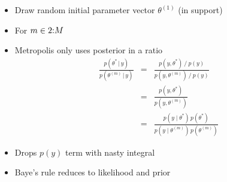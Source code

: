 \documentclass[10pt]{report}
\begin{document}
%
\begin{itemize}
\item Draw random initial parameter vector $\theta^{(1)}$ (in
  support)
\item For $m \in 2{:}M$
\hspace*{-8pt}
\end{itemize}


%
\begin{itemize}
\item Metropolis only uses posterior in a ratio
\begin{eqnarray*}
\frac{p(\theta^{*} \, | \, y)}
     {p(\theta^{(m)} \, | \, y)}
& = &
\frac{p(y, \theta^*) \ / \ p(y)}
     {p(y, \theta^{(m)}) \ / \ p(y)}
\\[8pt]
& = &
\frac{p(y, \theta^*)}
     {p(y, \theta^{(m)})}
\\[8pt]
& = &
\frac{p(y \mid \theta^*) \, p(\theta^*)}
     {p(y \mid \theta^{(m)}) \, p(\theta^{(m)})}
\end{eqnarray*}
\item Drops $p(y)$ term with nasty integral
\item Baye's rule reduces to likelihood and prior
\end{itemize}
\end{document}
